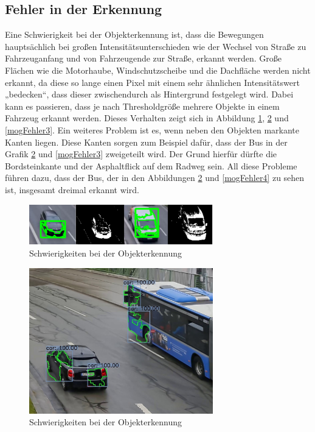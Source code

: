 \documentclass[conference]{IEEEtran}
\begin{document}
	\subsection{Fehler in der Erkennung}
	Eine Schwierigkeit bei der Objekterkennung ist, dass die Bewegungen hauptsächlich bei großen Intensitätsunterschieden wie der Wechsel von Straße zu Fahrzeuganfang und von Fahrzeugende zur Straße, erkannt werden. Große Flächen wie die Motorhaube, Windschutzscheibe und die Dachfläche werden nicht erkannt, da diese so lange einen Pixel mit einem sehr ähnlichen Intensitätswert „bedecken“, dass dieser zwischendurch als Hintergrund festgelegt wird. Dabei kann es passieren, dass je nach Thresholdgröße mehrere Objekte in einem Fahrzeug erkannt werden. Dieses Verhalten zeigt sich in Abbildung \ref{mogFehler1}, \ref{mogFehler2} und \ref{mogFehler3}.
	Ein weiteres Problem ist es, wenn neben den Objekten markante Kanten liegen. Diese Kanten sorgen zum Beispiel dafür, dass der Bus in der Grafik \ref{mogFehler2} und \ref{mogFehler3} zweigeteilt wird. Der Grund hierfür dürfte die Bordsteinkante und der Asphaltflick auf dem Radweg sein. All diese Probleme führen dazu, dass der Bus, der in den Abbildungen \ref{mogFehler2} und \ref{mogFehler4} zu sehen ist, insgesamt dreimal erkannt wird.\\
	\begin{figure}[!h]
		\begin{center}
			\includegraphics[width=8cm]{Media/MOGVergleich.png}
			\caption{Schwierigkeiten bei der Objekterkennung}
			\label{mogFehler1}
		\end{center}
	\end{figure}
	\begin{figure}[!h]
		\begin{center}
			\includegraphics[width=8cm]{Media/Output_733.jpg}
			\caption{Schwierigkeiten bei der Objekterkennung}
			\label{mogFehler2}
		\end{center}
	\end{figure}
\end{document}
